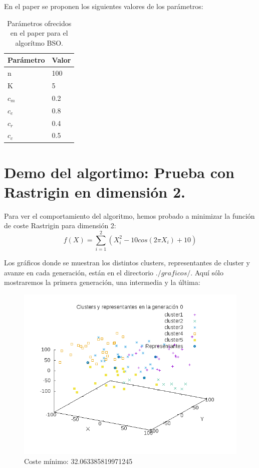 En el  paper se proponen los siguientes valores de los parámetros:\\

\begin{table}[htbp]
	\begin{center}
		\begin{tabular}{|l|l|}
			\hline
			Parámetro & Valor \\
			\hline \hline
			n & 100\\ \hline
			K & 5\\ \hline
			$c_m$ & 0.2\\ \hline
			$c_e$ & 0.8\\ \hline
			$c_r$ & 0.4\\ \hline
			$c_c$ & 0.5\\ \hline

		\end{tabular}
		\caption{Parámetros ofrecidos en el paper para el algorítmo BSO.}
		\label{tabla:}
	\end{center}
\end{table}




\newpage

\section{Demo del algortimo: Prueba con Rastrigin en dimensión 2.}

Para ver el comportamiento del algoritmo, hemos probado a minimizar la función de coste Rastrigin para dimensión 2:\\

\[f(X)=\sum_{i=1}^{2}(X_i^2-10cos(2\pi X_i)+10)\]

Los gráficos donde se muestran los distintos clusters, representantes de cluster y avanze en cada generación, están en el directorio $./graficos/$. Aquí sólo mostraremos la primera generación, una intermedia y la última:\\

\begin{figure}[H]
\centering
\includegraphics[width=0.7\linewidth]{graficos/0out}
\caption{Coste mínimo: 32.063385819971245}
\label{fig:0out}
\end{figure}


